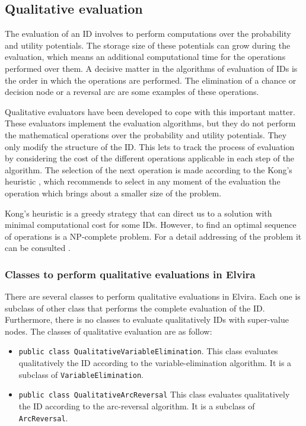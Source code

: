 \subsection{Qualitative evaluation}

The evaluation of an ID involves to perform computations over the
probability and utility potentials. The storage size of these potentials can
grow during the evaluation, which means an additional computational time for
the operations performed over them. A decisive matter in the algorithms of
evaluation of IDs is the order in which the operations are performed. The
elimination of a chance or decision node or a reversal arc are some examples
of these operations.

Qualitative evaluators have been developed to cope with this important
matter. These evaluators implement the evaluation algorithms, but they do
not perform the mathematical operations over the probability and utility
potentials. They only modify the structure of the ID. This lets to track the
process of evaluation by considering the cost of the different operations
applicable in each step of the algorithm. The selection of the next
operation is made according to the Kong's heuristic \cite{kong86}, which
recommends to select in any moment of the evaluation the operation which
brings about a smaller size of the problem.

Kong's heuristic is a greedy strategy that can direct us to a solution with
minimal computational cost for some IDs. However, to find an optimal
sequence of operations is a NP-complete problem. For a detail addressing of
the problem it can be consulted \cite{gomez01}.

\subsubsection{Classes to perform qualitative evaluations in Elvira}

There are several classes to perform qualitative evaluations in Elvira. Each
one is subclass of other class that performs the complete evaluation of the
ID. Furthermore, there is no classes to evaluate qualitatively IDs with
super-value nodes. The classes of qualitative evaluation are as follow:

\begin{itemize}
\item \texttt{public class QualitativeVariableElimination}. This class
evaluates qualitatively the ID according to the variable-elimination
algorithm. It is a subclass of \texttt{VariableElimination}.

\item \texttt{public class QualitativeArcReversal} This class evaluates
qualitatively the ID according to the arc-reversal algorithm. It is a
subclass of \texttt{ArcReversal}.
\end{itemize}


